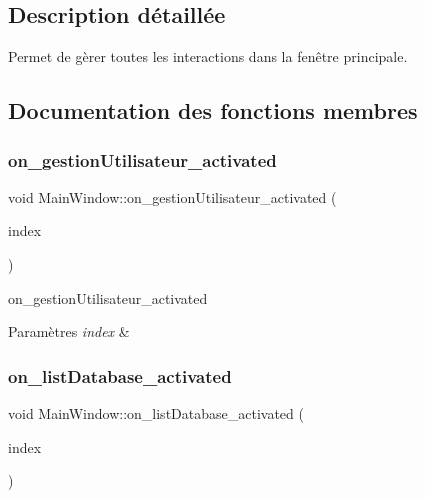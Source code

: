 \subsection{Description détaillée}
Permet de gèrer toutes les interactions dans la fenêtre principale. 

\subsection{Documentation des fonctions membres}
\mbox{\label{class_main_window_a9c3a8c1df5ed2f93b79333aeab5a3323}} 
\subsubsection{\texorpdfstring{on\+\_\+gestion\+Utilisateur\+\_\+activated}{on\_gestionUtilisateur\_activated}}
{\footnotesize\ttfamily void Main\+Window\+::on\+\_\+gestion\+Utilisateur\+\_\+activated (\begin{DoxyParamCaption}\item[{const Q\+Model\+Index \&}]{index }\end{DoxyParamCaption})\hspace{0.3cm}{\ttfamily [slot]}}



on\+\_\+gestion\+Utilisateur\+\_\+activated 


\begin{DoxyParams}{Paramètres}
{\em index} & \\
\hline
\end{DoxyParams}
\mbox{\label{class_main_window_a37382033fa3cefb818a17d198707abe1}} 
\subsubsection{\texorpdfstring{on\+\_\+list\+Database\+\_\+activated}{on\_listDatabase\_activated}}
{\footnotesize\ttfamily void Main\+Window\+::on\+\_\+list\+Database\+\_\+activated (\begin{DoxyParamCaption}\item[{const Q\+Model\+Index \&}]{index }\end{DoxyParamCaption})\hspace{0.3cm}{\ttfamily [slot]}}



